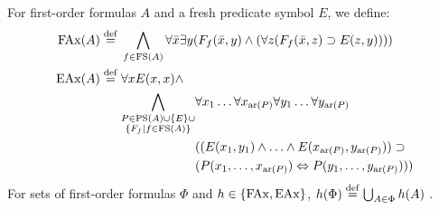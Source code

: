 \begin{defi}
	For first-order formulas $A$ and a fresh predicate symbol $E$, we define:\nopagebreak
	\begin{align*}
		\mathrm{FAx}(A) \stackrel{\mathrm{def}}{=}{} &\bigwedge_{f \in \mathrm{FS}(A)}  \forall \bar x \exists y (F_f(\bar x, y) \land (\forall z (F_f(\bar x, z) \supset E(z, y)))) \\
		\mathrm{EAx}(A) \stackrel{\mathrm{def}}{=}{} & \forall x E(x,x)\land  \\
																		 & \begin{aligned} \bigwedge_{\substack{P \in\mathrm{PS}(A)\cup\{E\}\cup\\ \{F_f\mid f\in \mathrm{FS}(A)\}}} &\forall x_1 \ldots \forall x_{\mathrm{ar}(P)} \forall y_1 \ldots \forall y_{\mathrm{ar}(P)} \\
																		 & (( E(x_1,y_1) \land \ldots \land E(x_{\mathrm{ar}(P)},  y_{\mathrm{ar}(P)})) \supset  \\
																 &  (P(x_1, \ldots, x_{\mathrm{ar}(P)}) \Leftrightarrow P(y_1, \ldots, y_{\mathrm{ar}(P)}) ) ) \end{aligned} 
\end{align*}
For sets of first-order formulas $\Phi$ and $h \in \{\mathrm{FAx}, \mathrm{EAx}\}$, $h(\Phi) \stackrel{\mathrm{def}}{=} \bigcup_{A\in \Phi} h(A)$ .
\end{defi}

